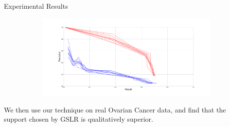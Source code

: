 \documentclass[svgnames,final]{beamer}
\begin{document}
\begin{frame}
\begin{columns}[T]
\begin{column}{.3\linewidth}
\begin{block}{Experimental Results}
\begin{figure}[h]
\begin{subfigure}{.5\textwidth}
		  \centering
		  \includegraphics[width=\linewidth]{images/3.pdf}
		  \label{fig:sub4}
		\end{subfigure}
		\label{fig:perf}
		\end{figure}

		We then use our technique on real Ovarian Cancer data,
		and find that the support chosen by GSLR is qualitatively superior.

	\end{block}

	\vspace{2cm}





\end{column}
\end{columns}
\end{frame}
\end{document}
